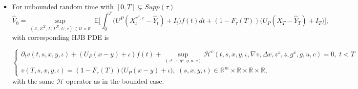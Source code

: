 \documentclass[11pt,a4paper]{article}
\theoremstyle{thmstyleone}%
\newtheorem{theorem}{Theorem}%
\theoremstyle{thmstyletwo}%
\theoremstyle{thmstylethree}%
\newcommand{\E}{\mathbb{E}}
\newcommand{\T}{T \wedge \tau}
\begin{document}
\begin{itemize}
\begin{theorem}[Verification Theorem - bounded case]\label{thm:verif:consumption:bounded}
Assume that there exists a function $\phi$ twice continuously differentiable in space and differentiable in time, such that $\phi(t,s,x,y,\iota)$ solves \eqref{pde:bounded:consumption}. Furthermore, assume that $\phi$ has a quadratic growth in $y$ and polynomial growth in $s,x,\iota$ such that 
\[|\phi(t,s,x,y,\iota)|\leq \kappa(1+|x|^p+\|s\|^p+|\iota|^p+|y|^2),\; p>1,\; \kappa>0.\]

Then, for each $t \in [0,T]$, the strategy $(\hat{Z}^X, \hat{Z}, \hat{\Gamma}^X, \hat{\Gamma}, \hat{U},\hat c)$ is an optimal control for the investor's problem and

\begin{align*}
    \phi(0,S_0,x,0,0)=V_0 =  \sup_{(Z^X, Z, \Gamma^X, \Gamma, U,c)} \mathbb{E}\left[ U_P(X_{T \wedge \tau}^{\pi^*} - \hat{Y}_{T \wedge \tau})+I_{T\wedge \tau}\right]-\hat{Y_0}.
\end{align*}
Let $c^*(t,s,x,y,\iota)$ be an optimizer of $\mathcal L^\phi(t,s,x,y,\iota,c)$ such that (SDE) admits a unique solution with this choice of $c$. 
The optimal contract is given by 
\begin{align*}
    \xi^\star 
    &= \hat{Y}_0+ \int_{0}^{\T} \sum_{i=1}^m \frac{\hat{Z}^i_t}{S^i_t} dS^i_t + \int_0^{\T} \hat{Z}_t^X dX_t + \int_{0}^{\T} \hat{U}_s dH_s \\
    &+ \frac{1}{2}\int_0^{\T} (\hat{\Gamma}_t^X + \eta (\hat{Z}_t^X)^2 ) d\langle X, X\rangle_t - \int_0^{\T} F(t, \hat{Z}_t, \hat{Z}_t^X, \hat{\Gamma}_t, \hat{\Gamma}_t^X,\pi^*_t,\hat c_t) dt\\
    &+\int_0^{\T} \sum_{i=1}^m \frac{\hat{\Gamma}^i_s}{S^i_t} d\langle S^i, X\rangle_t,
\end{align*}
and the optimal consumption is given by $\hat c_t:=c^*(t,S_t,X^{\pi^*,\hat c}_t,\hat Y_t,I_t)$.
\end{theorem}


\item For unbounded random time with $[0,T]\subsetneq Supp(\tau)$
\begin{equation*}
  \hat V_0= \sup_{(Z, Z^X, \Gamma, \Gamma^X, U,c)\in \mathcal U\times \mathfrak C}\;  \E\bigl[ \int_{0}^T \big(U^P(X_t^{\pi^*,c} - \hat{Y}_t) +I_t\big) f(t)dt+(1-F_\tau(T))\big(U_P(X_T-\hat Y_T)+I_T\big) \bigl],
\end{equation*}
with corresponding HJB PDE is

\begin{equation}\label{pde:unbounded:consumption}
\begin{cases}
  \partial_t v(t,s,x,y,\iota) + (U_P(x - y)+\iota)f(t) + \sup_{(z^x, z, g^x, g, u,c)}  \mathcal H^v(t,s, x, y,\iota, \nabla v, \Delta v, z^x, z, g^x, g, u,c)=0,\; t<T\\
v(T,s,x,y,\iota)=(1-F_\tau(T))\big(U_P(x-y)+\iota\big),\; (s,x,y,\iota)\in\mathbb R^m\times \mathbb R\times \mathbb R\times\mathbb R,
\end{cases}
\end{equation}
with the same $\mathcal H$ operator as in the bounded case. 




\end{itemize}
\end{document}
